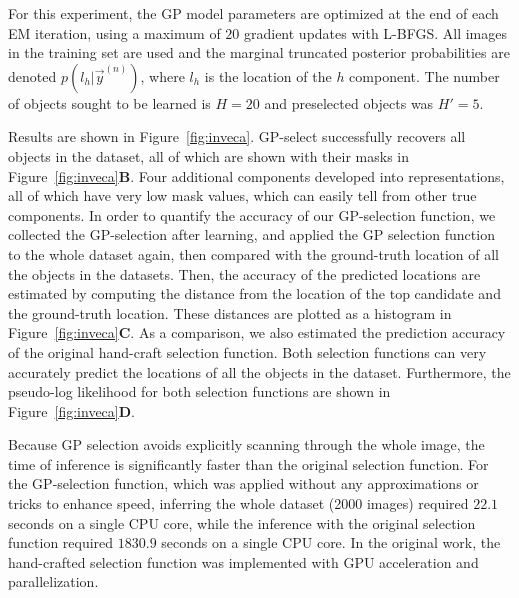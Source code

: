 %
For this experiment, the GP model parameters are optimized at the end of each EM iteration, using a maximum of $20$ gradient updates with L-BFGS.
All images in the training set are used and the marginal truncated posterior probabilities are denoted $p(l_h | \vec{y}^{(n)})$, where $l_h$ is the location of the $h$ component. The number of objects sought to be learned is $H=20$ and preselected objects was $H'=5$.

Results are shown in Figure~\ref{fig:inveca}.
GP-select successfully recovers all objects in the dataset, all of which are shown with their masks in Figure~\ref{fig:inveca}\textbf{B}.
Four additional components developed into representations, all of which have very low mask values,  which can easily tell from other true components.
In order to quantify the accuracy of our GP-selection function, we collected the GP-selection after learning, and applied the GP selection function to the whole dataset again, then compared with the ground-truth location of all the objects in the datasets.
%
Then, the accuracy of the predicted locations are estimated by computing the distance from the location of the top candidate and the ground-truth location.
These distances are plotted as a histogram in Figure~\ref{fig:inveca}\textbf{C}.
As a comparison, we also estimated the prediction accuracy of the original hand-craft selection function. Both selection functions can very accurately predict the locations of all the objects in the dataset.
Furthermore, the pseudo-log likelihood for both selection functions are shown in Figure~\ref{fig:inveca}\textbf{D}.

Because GP selection avoids explicitly scanning through the whole image, the time of inference is significantly faster than the original selection function. For the GP-selection function, which was applied without any approximations or tricks to enhance speed, inferring the whole dataset (2000 images) required $22.1$ seconds on a single CPU core, while the inference with the original selection function required $1830.9$ seconds on a single CPU core.
In the original work, the hand-crafted selection function was implemented with GPU acceleration and parallelization.



